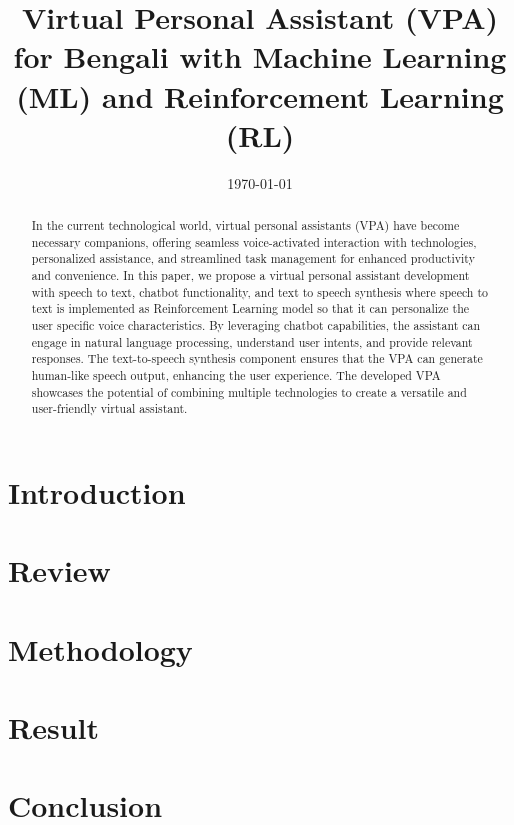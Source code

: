 \documentclass[conference]{IEEEtran}
\title{Virtual Personal Assistant (VPA) for Bengali with Machine Learning (ML) and Reinforcement Learning (RL)}
\author{\IEEEauthorblockN{Sadidul Islam}
\IEEEauthorblockA{\textit{Student, MSCSE} \\
\textit{United Internation University}\\
Bangladesh \\
sadid@soceton.com}
}
\date{\today}
\begin{document}
\maketitle

\begin{abstract}
    In the current technological world, virtual personal assistants (VPA) have become necessary companions, offering seamless voice-activated interaction with technologies, personalized assistance, and streamlined task management for enhanced productivity and convenience.
    In this paper, we propose a virtual personal assistant development with speech to text, chatbot functionality, and text to speech synthesis where speech to text is implemented as Reinforcement Learning model so that it can personalize the user specific voice characteristics.
    By leveraging chatbot capabilities, the assistant can engage in natural language processing, understand user intents, and provide relevant responses.
    The text-to-speech synthesis component ensures that the VPA can generate human-like speech output, enhancing the user experience.
    The developed VPA showcases the potential of combining multiple technologies to create a versatile and user-friendly virtual assistant.
\end{abstract}

\section{Introduction}\label{sec:introduction}


\section{Review}\label{sec:review}


\section{Methodology}\label{sec:methodology}


\section{Result}\label{sec:result}


\section{Conclusion}\label{sec:conclusion}



\end{document}
